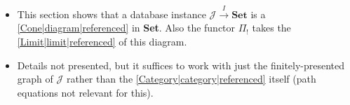 \begin{itemize}
    \item This section shows that a database instance $\mathcal{J}\xrightarrow{I}\mathbf{Set}$ is a \ref{Cone|diagram|referenced} in \textbf{Set}. Also the functor $\Pi_!$ takes the \ref{Limit|limit|referenced} of this diagram.
    \item Details not presented, but it suffices to work with just the finitely-presented graph of $\mathcal{J}$ rather than the \ref{Category|category|referenced} itself (path equations not relevant for this).
  \end{itemize}
